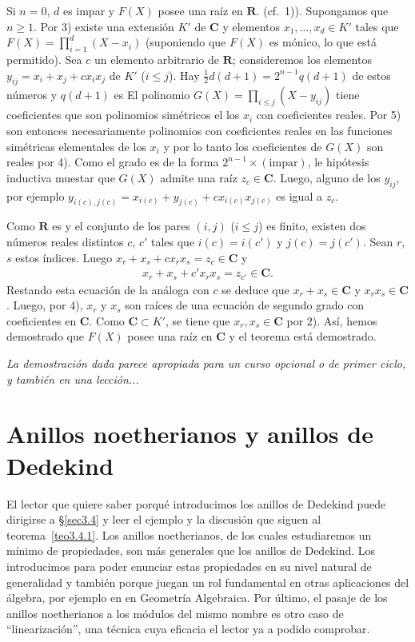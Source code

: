 \documentclass[bibtotoc,leqno,spanish]{amsbook}
\let\emph\relax %
\newcommand{\RR}{\mathbf{R}}
\newcommand{\CC}{\mathbf{C}}
\numberwithin{equation}{section}
\newenvironment{comm}%
	{\begin{list}{}{\setlength{\leftmargin}{2\parindent}\setlength{\topsep}{\baselineskip}}\item\itshape}
	{\end{list}}
\theoremstyle{note}
\theoremstyle{note}
\theoremstyle{rem}
\numberwithin{theorem}{section}
\numberwithin{proposition}{section}
\numberwithin{definition}{section}
\numberwithin{lemma}{section}
\numberwithin{corollary}{section}
\numberwithin{example}{section}
\numberwithin{footnote}{section}%
\begin{document}
Si $n = 0$, $d$ es impar y
$F(X)$ posee una ra\'iz en $\RR$. (cf.~1)). Supongamos que $n \geq 1$. Por 3) existe una extensi\'on
$K'$ de $\CC$ y elementos $x_{1},\dots,x_{d}\in K'$ tales que $F(X) = \prod_{i=1}^{d}(X-x_{i})$
(suponiendo que $F(X)$ es m\'onico, lo que est\'a permitido). Sea $c$ un elemento arbitrario de $\RR$;
consideremos los elementos $y_{ij} = x_{i}+x_{j}+cx_{i}x_{j}$ de $K'$ ($i\leq j$). Hay
$\frac{1}{2}d(d+1) = 2^{n-1}q(d+1)$ de estos n\'umeros y $q(d+1)$ es \emph{impar.} El polinomio
$G(X) = \prod_{i\leq j}(X-y_{ij})$ tiene coeficientes que son polinomios sim\'etricos el los $x_{i}$
con coeficientes reales. Por 5) son entonces necesariamente polinomios con coeficientes reales
en las funciones sim\'etricas elementales de los $x_{i}$ y por lo tanto los coeficientes de $G(X)$
son reales por 4). Como el grado es de la forma $2^{n-1}\times(\text{impar})$, le hip\'otesis
inductiva muestar que $G(X)$ admite una ra\'iz $z_{c}\in\CC$. Luego, alguno de los $y_{ij}$,
por ejemplo $y_{i(c),j(c)} = x_{i(c)}+y_{j(c)}+cx_{i(c)}x_{j(c)}$ es igual a $z_{c}$.

Como $\RR$ es \emph{infinito} y el conjunto de los pares $(i,j)$ ($i\leq j$) es finito, existen
dos n\'umeros reales distintos $c$, $c'$ tales que $i(c) = i(c')$ y $j(c) = j(c')$. Sean $r$, $s$
estos \'indices. Luego $x_{r}+x_{s}+cx_{r}x_{s} = z_{c}\in\CC$ y
\begin{gather*}
x_{r}+x_{s}+c'x_{r}x_{s}=z_{c'}\in\CC.
\end{gather*}
Restando esta ecuaci\'on de la an\'aloga con $c$ se deduce que $x_{r}+x_{s}\in\CC$ y $x_{r}x_{s}\in\CC$.
Luego, por 4), $x_{r}$ y $x_{s}$ son ra\'ices de una ecuaci\'on de segundo grado con coeficientes
en $\CC$. Como $\CC\subset K'$, se tiene que $x_{r},x_{s}\in\CC$ por 2). As\'i, hemos demostrado que
$F(X)$ posee una ra\'iz en $\CC$ y el teorema est\'a demostrado.

\begin{comm}
La demostraci\'on dada parece apropiada para un curso opcional o de primer ciclo, y tambi\'en
en una lecci\'on...
\end{comm}

\chapter{Anillos noetherianos y anillos de Dedekind}\label{cap3}

El lector que quiere saber porqu\'e introducimos los anillos de Dedekind puede dirigirse
a \S\ref{sec3.4} y leer el ejemplo y la discusi\'on que siguen al teorema~\ref{teo3.4.1}.
Los anillos noetherianos, de los cuales estudiaremos un m\'inimo de propiedades, son m\'as generales que los
anillos de Dedekind. Los introducimos para poder enunciar estas propiedades en su
nivel natural de generalidad y tambi\'en porque juegan un rol fundamental en otras aplicaciones
del \'algebra, por ejemplo en en Geometr\'ia Algebraica. Por \'ultimo, el pasaje de los anillos noetherianos
a los m\'odulos del mismo nombre es otro caso de ``linearizaci\'on'', una t\'ecnica cuya eficacia
el lector ya a podido comprobar.
\end{document}
